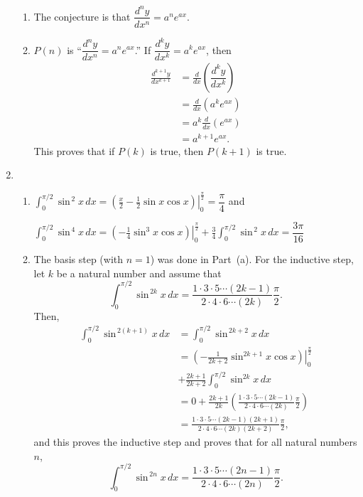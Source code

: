 \begin{enumerate}
\begin{enumerate}
\item The conjecture is that $\dfrac{{d^n y}}{{dx^n }} = a^n e^{ax}$.

\item $P \left( n \right)$ is ``$\dfrac{{d^n y}}{{dx^n }} = a^n e^{ax}$.''
If $\dfrac{{d^k y}}{{dx^k }} = a^k e^{ax}$, then 
\begin{align*}
\frac{{d^{k+1} y}}{{dx^{k+1} }} &= \frac{d}{dx} \left( \dfrac{{d^k y}}{{dx^k }} \right) \\
  &= \frac{d}{dx} \left( a^k e^{ax} \right) \\
  &=  a^k  \frac{d}{dx} \left( e^{ax} \right) \\
  &=  a^{k+1} e^{ax}.
\end{align*}
This proves that if $P \left( k \right)$ is true, then $P \left( k + 1 \right)$ is true.
\end{enumerate}



\item \begin{enumerate}
\item $\displaystyle\int_{0}^{\pi/2} \sin^{\,2} x \, dx = \left( \left. \frac{x}{2} - \frac{1}{2} \sin x \cos x \right) \right|_0^{\frac{\pi}{2}} = \dfrac{\pi}{4}$ and 

$\displaystyle\int_{0}^{\pi/2} \sin^{\,4} x \, dx = \left( \left. -\frac{1}{4} \sin^{3}x \cos x \right) \right|_0^{\frac{\pi}{2}} + \frac{3}{4} \displaystyle\int_{0}^{\pi/2} \sin^{\,2} x \, dx = \dfrac{3 \pi}{16}$

\item The basis step (with $n = 1$) was done in Part~(a).  For the inductive step, let $k$ be a natural number and assume that
\[
\int_{0}^{\pi/2} \sin^{\,2k}x \, dx = \frac{1 \cdot 3 \cdot 5 \cdots (2k - 1)}{2 \cdot 4 \cdot 6 \cdots (2k)} \frac{\pi}{2}.
\]
Then,
\begin{align*}
\int_{0}^{\pi/2} \sin^{\,2(k+1)}x \, dx &= \int_{0}^{\pi/2} \sin^{\,2k + 2}x \, dx \\
  &= \left( \left. -\frac{1}{2k + 2} \sin^{2k+1}x \cos x \right) \right|_0^{\frac{\pi}{2}} \\ &+ \frac{2k+1}{2k+2} \int_{0}^{\pi/2} \sin^{2k}x \, dx \\
  &= 0 + \frac{2k+1}{2k} \left(\frac{1 \cdot 3 \cdot 5 \cdots (2k - 1)}{2 \cdot 4 \cdot 6 \cdots (2k)} \frac{\pi}{2} \right) \\
  &= \frac{1 \cdot 3 \cdot 5 \cdots (2k - 1)(2k + 1)}{2 \cdot 4 \cdot 6 \cdots (2k)(2k + 2)} \frac{\pi}{2},
\end{align*}
and this proves the inductive step and proves that for all natural numbers $n$,
\[
\int_{0}^{\pi/2} \sin^{\,2n}x \, dx = \frac{1 \cdot 3 \cdot 5 \cdots (2n - 1)}{2 \cdot 4 \cdot 6 \cdots (2n)} \frac{\pi}{2}.
\]


\end{enumerate}
\end{enumerate}
